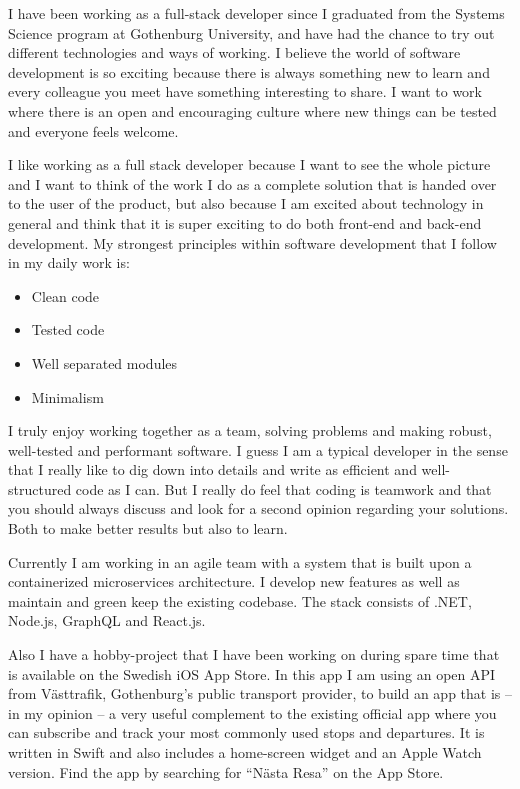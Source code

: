

I have been working as a full-stack developer since I graduated from the Systems Science program at
Gothenburg University, and have had the chance to try out different technologies and ways
of working. I believe the world of software development is so exciting because there is always something new
to learn and every colleague you meet have something interesting to share. I want to work where there is an
open and encouraging culture where new things can be tested and everyone feels welcome.

I like working as a full stack developer because I want to see the whole picture and I want to think of the work
I do as a complete solution that is handed over to the user of the product, but also because I am
excited about technology in general and think that it is super exciting to do both front-end and
back-end development. My strongest principles within software development that I follow in my daily work is:

\begin{itemize}
  \item Clean code
  \item Tested code
  \item Well separated modules
  \item Minimalism
\end{itemize}

I truly enjoy working together as a team, solving problems and making robust, well-tested and
performant software. I guess I am a typical developer in the sense that I really like
to dig down into details and write as efficient and well-structured code as I can. But I really do feel that coding
is teamwork and that you should always discuss and look for a second opinion regarding your solutions.
Both to make better results but also to learn.

Currently I am working in an agile team with a system that is built upon a containerized microservices architecture.
I develop new features as well as maintain and green keep the existing codebase.
The stack consists of .NET, Node.js, GraphQL and React.js.

Also I have a hobby-project that I have been working on during spare time that is available
on the Swedish iOS App Store. In this app I am using an open API from Västtrafik, Gothenburg’s public
transport provider, to build an app that is – in my opinion – a very useful complement to the
existing official app where you can subscribe and track your most commonly used stops and departures.
It is written in Swift and also includes a home-screen widget and an Apple Watch version. Find
the app by searching for “Nästa Resa” on the App Store.

